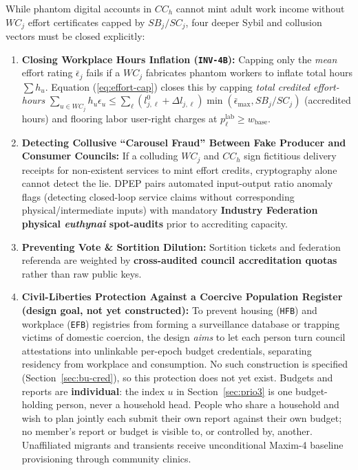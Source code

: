 \documentclass[10pt,twoside,openany]{book}
\theoremstyle{dpepstyle}
\begin{document}
While phantom digital accounts in $CC_h$ cannot mint adult work income without $WC_j$ effort certificates capped by $SB_j/SC_j$, four deeper Sybil and collusion vectors must be closed explicitly:
\begin{enumerate}[leftmargin=1.8em,itemsep=2pt]
  \item \textbf{Closing Workplace Hours Inflation (\texttt{INV-4B}):} Capping only the \emph{mean} effort rating $\bar{\epsilon}_j$ fails if a $WC_j$ fabricates phantom workers to inflate total hours $\sum h_u$. Equation (\ref{eq:effort-cap}) closes this by capping \emph{total credited effort-hours} $\sum_{u \in WC_j} h_u \epsilon_u \le \sum_\ell (l^0_{j,\ell}+\Delta l_{j,\ell}) \min(\bar{\epsilon}_{\max}, SB_j/SC_j)$ (accredited hours) and flooring labor user-right charges at $p^{\text{lab}}_\ell \ge w_{\text{base}}$.
  \item \textbf{Detecting Collusive ``Carousel Fraud'' Between Fake Producer and Consumer Councils:} If a colluding $WC_j$ and $CC_h$ sign fictitious delivery receipts for non-existent services to mint effort credits, cryptography alone cannot detect the lie. DPEP pairs automated input-output ratio anomaly flags (detecting closed-loop service claims without corresponding physical/intermediate inputs) with mandatory \textbf{Industry Federation physical \emph{euthynai} spot-audits} prior to accrediting capacity.
  \item \textbf{Preventing Vote \& Sortition Dilution:} Sortition tickets and federation referenda are weighted by \textbf{cross-audited council accreditation quotas} rather than raw public keys.
  \item \textbf{Civil-Liberties Protection Against a Coercive Population Register (design goal, not yet constructed):} To prevent housing (\texttt{HFB}) and workplace (\texttt{EFB}) registries from forming a surveillance database or trapping victims of domestic coercion, the design \emph{aims} to let each person turn council attestations into unlinkable per-epoch budget credentials, separating residency from workplace and consumption. No such construction is specified (Section~\ref{sec:bu-cred}), so this protection does not yet exist. Budgets and reports are \textbf{individual}: the index $u$ in Section~\ref{sec:prio3} is one budget-holding person, never a household head. People who share a household and wish to plan jointly each submit their own report against their own budget; no member's report or budget is visible to, or controlled by, another. Unaffiliated migrants and transients receive unconditional Maxim-4 baseline provisioning through community clinics.
\end{enumerate}
\end{document}

